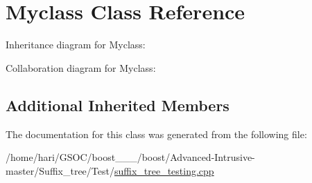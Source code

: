 \hypertarget{classMyclass}{}\section{Myclass Class Reference}
\label{classMyclass}


Inheritance diagram for Myclass\+:


Collaboration diagram for Myclass\+:
\subsection*{Additional Inherited Members}


The documentation for this class was generated from the following file\+:\begin{DoxyCompactItemize}
\item 
/home/hari/\+G\+S\+O\+C/boost\+\_\+\_\+\_/boost/\+Advanced-\/\+Intrusive-\/master/\+Suffix\+\_\+tree/\+Test/\hyperlink{suffix__tree__testing_8cpp}{suffix\+\_\+tree\+\_\+testing.\+cpp}\end{DoxyCompactItemize}
